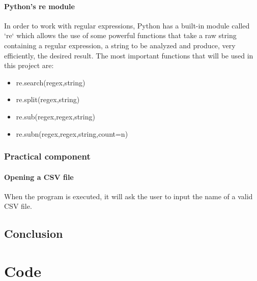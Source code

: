 \documentclass[11pt,a4paper,times]{report}
\begin{document}
\subsubsection*{Python's re module}In order to work with regular expressions,
Python has a built-in module called `re` which allows the use of some powerful
functions that take a raw string containing a regular expression, a string to be analyzed
and produce, very efficiently, the desired result.
The most important functions that will be used in this project are:
\begin{itemize}
    \item{re.search(regex,string)}
    \item{re.split(regex,string)}
    \item{re.sub(regex,regex,string)}
    \item{re.subn(regex,regex,string,count=n)}
\end{itemize}

\subsection{Practical component} \label{practice}

\subsubsection*{Opening a CSV file} When the program is executed, it will ask the user to input
the name of a valid CSV file.

\section{Conclusion} \label{conclusion}

\chapter{Code} \label{chap:code}
\end{document}
